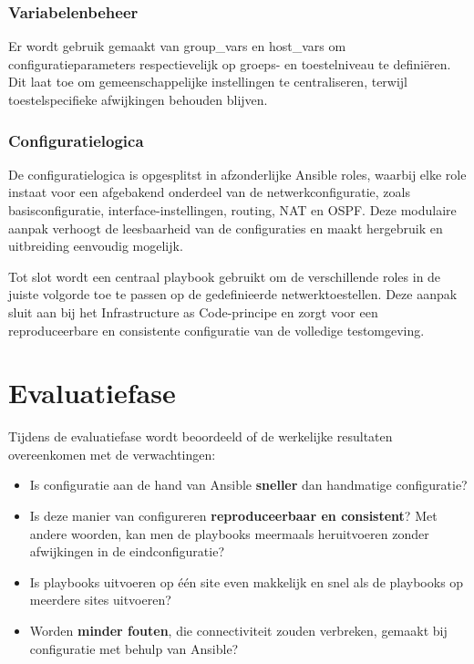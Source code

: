 \subsubsection{Variabelenbeheer}
Er wordt gebruik gemaakt van group\_vars en host\_vars om configuratieparameters respectievelijk op groeps- en toestelniveau te definiëren.
Dit laat toe om gemeenschappelijke instellingen te centraliseren, terwijl toestelspecifieke afwijkingen behouden blijven.

\subsubsection{Configuratielogica}
De configuratielogica is opgesplitst in afzonderlijke Ansible roles, waarbij elke role instaat voor een afgebakend onderdeel van de netwerkconfiguratie, zoals basisconfiguratie, interface-instellingen, routing, NAT en OSPF.
Deze modulaire aanpak verhoogt de leesbaarheid van de configuraties en maakt hergebruik en uitbreiding eenvoudig mogelijk.

Tot slot wordt een centraal playbook gebruikt om de verschillende roles in de juiste volgorde toe te passen op de gedefinieerde netwerktoestellen.
Deze aanpak sluit aan bij het Infrastructure as Code-principe en zorgt voor een reproduceerbare en consistente configuratie van de volledige testomgeving.

    
\section{Evaluatiefase}
Tijdens de evaluatiefase wordt beoordeeld of de werkelijke resultaten overeenkomen met de verwachtingen:
\begin{itemize}
    \item Is configuratie aan de hand van Ansible \textbf{sneller} dan handmatige configuratie?
    \item Is deze manier van configureren \textbf{reproduceerbaar en consistent}? Met andere woorden, kan men de playbooks meermaals heruitvoeren zonder afwijkingen in de eindconfiguratie?
    \item Is playbooks uitvoeren op één site even makkelijk en snel als de playbooks op meerdere sites uitvoeren?
    \item Worden \textbf{minder fouten}, die connectiviteit zouden verbreken, gemaakt bij configuratie met behulp van Ansible?
\end{itemize}

